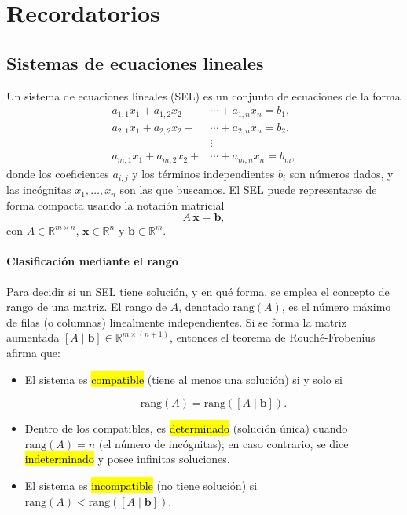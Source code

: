 \section{Recordatorios}

\subsection{Sistemas de ecuaciones lineales}
\label{sec:sel}

Un sistema de ecuaciones lineales (SEL) es un conjunto de ecuaciones de la forma
\begin{align*}
  a_{1,1}x_1 + a_{1,2}x_2 + &\cdots + a_{1,n}x_n = b_1,\\
  a_{2,1}x_1 + a_{2,2}x_2 + &\cdots + a_{2,n}x_n = b_2,\\
  &\vdots\\
  a_{m,1}x_1 + a_{m,2}x_2 + &\cdots + a_{m,n}x_n = b_m,
\end{align*}
donde los coeficientes \(a_{i,j}\) y los términos independientes \(b_i\) son números dados, y las incógnitas \(x_1,\dots,x_n\) son las que buscamos. El SEL puede representarse de forma compacta usando la notación matricial
\[
  A\,\mathbf{x} = \mathbf{b},
\]
con \(A\in\mathbb{R}^{m\times n}\), \(\mathbf{x}\in\mathbb{R}^n\) y \(\mathbf{b}\in\mathbb{R}^m\).

\vspace{5pt}

\paragraph{Clasificación mediante el rango}

Para decidir si un SEL tiene solución, y en qué forma, se emplea el concepto de rango de una matriz. El rango de \(A\), denotado \(\mathrm{rang}(A)\), es el número máximo de filas (o columnas) linealmente independientes. Si se forma la matriz aumentada \([A\mid \mathbf{b}]\in\mathbb{R}^{m\times(n+1)}\), entonces el teorema de Rouché-Frobenius afirma que:
\begin{itemize}
  \item El sistema es \hl{compatible} (tiene al menos una solución) si y solo si

  \[
  \mathrm{rang}(A) = \mathrm{rang}([A\mid \mathbf{b}]).
  \]
  \item Dentro de los compatibles, es \hl{determinado} (solución única) cuando
  \(\mathrm{rang}(A) = n\) (el número de incógnitas);
  en caso contrario, se dice \hl{indeterminado} y posee infinitas soluciones.
  \item El sistema es \hl{incompatible} (no tiene solución) si
  \(\mathrm{rang}(A) < \mathrm{rang}([A\mid \mathbf{b}])\).
\end{itemize}


